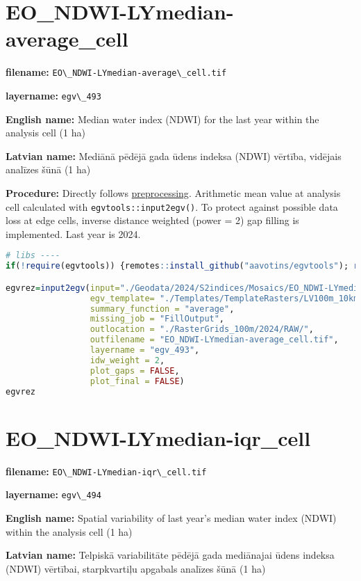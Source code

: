 \documentclass[
]{book}
\newcommand{\passthrough}[1]{#1}
\begin{document}
\section{EO\_NDWI-LYmedian-average\_cell}\label{ch06.493}

\textbf{filename:} \passthrough{\lstinline!EO\_NDWI-LYmedian-average\_cell.tif!}

\textbf{layername:} \passthrough{\lstinline!egv\_493!}

\textbf{English name:} Median water index (NDWI) for the last year within the analysis cell (1 ha)

\textbf{Latvian name:} Mediānā pēdējā gada ūdens indeksa (NDWI) vērtība, vidējais analīzes šūnā (1 ha)

\textbf{Procedure:} Directly follows \hyperref[Ch04.13]{preprocessing}. Arithmetic mean value at analysis cell
calculated with \passthrough{\lstinline!egvtools::input2egv()!}. To protect against possible data loss at edge cells,
inverse distance weighted (power = 2) gap filling is implemented. Last year is 2024.

\begin{lstlisting}[language=R]
# libs ----
if(!require(egvtools)) {remotes::install_github("aavotins/egvtools"); require(egvtools)}

egvrez=input2egv(input="./Geodata/2024/S2indices/Mosaics/EO_NDWI-LYmedian.tif",
                 egv_template= "./Templates/TemplateRasters/LV100m_10km.tif",
                 summary_function = "average",
                 missing_job = "FillOutput",
                 outlocation = "./RasterGrids_100m/2024/RAW/",
                 outfilename = "EO_NDWI-LYmedian-average_cell.tif",
                 layername = "egv_493",
                 idw_weight = 2,
                 plot_gaps = FALSE,
                 plot_final = FALSE)
egvrez
\end{lstlisting}

\section{EO\_NDWI-LYmedian-iqr\_cell}\label{ch06.494}

\textbf{filename:} \passthrough{\lstinline!EO\_NDWI-LYmedian-iqr\_cell.tif!}

\textbf{layername:} \passthrough{\lstinline!egv\_494!}

\textbf{English name:} Spatial variability of last year's median water index (NDWI) within the analysis cell (1 ha)

\textbf{Latvian name:} Telpiskā variabilitāte pēdējā gada mediānajai ūdens indeksa (NDWI) vērtībai, starpkvartiļu apgabals analīzes šūnā (1 ha)
\end{document}
